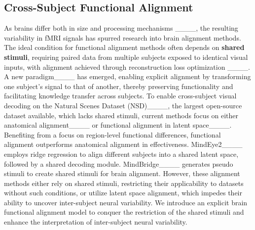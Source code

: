 \subsection{Cross-Subject Functional Alignment}
As brains differ both in size and processing mechanisms ____, the resulting variability in fMRI signals has spurred research into brain alignment methods.
The ideal condition for functional alignment methods often depends on \textbf{shared stimuli}, 
requiring paired data from multiple subjects exposed to identical visual inputs, with alignment achieved through reconstruction loss optimization ____.
A new paradigm____ has emerged, enabling explicit alignment by transforming one subject's signal to that of another, thereby preserving functionality and facilitating knowledge transfer across subjects.
To enable cross-subject visual decoding on the Natural Scenes Dataset (NSD)____, the largest open-source dataset available, which lacks shared stimuli, 
current methods focus on either anatomical alignment____ or functional alignment in latent space____.
Benefiting from a focus on region-level functional differences, functional alignment outperforms anatomical alignment in effectiveness.
MindEye2____ employs ridge regression to align different subjects into a shared latent space, followed by a shared decoding module.
MindBridge____ generates pseudo stimuli to create shared stimuli for brain alignment.
However, these alignment methods either rely on shared stimuli, restricting their applicability to datasets without such conditions, or utilize latent space alignment, which impedes their ability to uncover inter-subject neural variability.
We introduce an explicit brain functional alignment model to conquer the restriction of the shared stimuli and enhance the interpretation of inter-subject neural variability.
